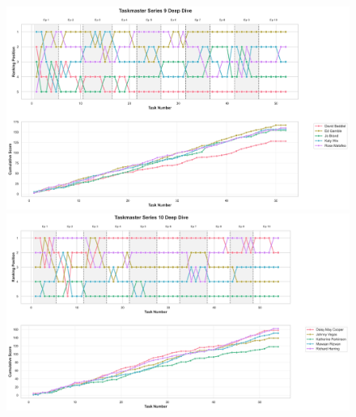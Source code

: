\documentclass[10pt,letterpaper]{article}
\begin{document}
\begin{figure}[!h]
\centering
\includegraphics[width=\linewidth]{supfigure/series_9_deep_dive.png}
\includegraphics[width=\linewidth]{supfigure/series_10_deep_dive.png}
\end{figure}
\FloatBarrier
\clearpage
\end{document}
